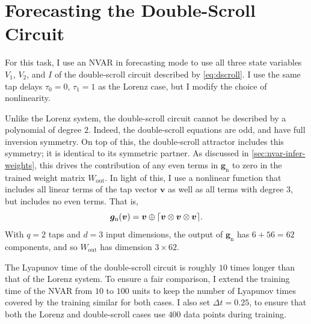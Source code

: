 \section{Forecasting the Double-Scroll Circuit}

For this task, I use an NVAR in forecasting mode to use all
three state variables $V_1$, $V_2$, and $I$ of the double-scroll
circuit described by \cref{eq:dscroll}. I use the same tap
delays $\tau_0 = 0$, $\tau_1 = 1$ as the Lorenz case, but I modify
the choice of nonlinearity.

Unlike the Lorenz system, the double-scroll circuit cannot be
described by a polynomial of degree $2$. Indeed, the double-scroll
equations are odd, and have full inversion symmetry. On top of this,
the double-scroll attractor includes this symmetry; it is identical to
its symmetric partner. As discussed in \cref{sec:nvar-infer-weights},
this drives the contribution of any even terms in $\bm{g}_\text{n}$ to
zero in the trained weight matrix $W_\text{out}$. In light of this, I
use a nonlinear function that includes all linear terms of the tap
vector $\bm{v}$ as well as all terms with degree $3$, but includes no
even terms. That is,
\begin{equation}
  \bm{g}_\text{n}(\bm{v}) = \bm{v} \oplus \lceil\bm{v} \otimes \bm{v} \otimes \bm{v}\rceil.
\end{equation}
With $q = 2$ taps and $d = 3$ input dimensions, the output of
$\bm{g}_\text{n}$ has $6 + 56 = 62$ components, and so $W_\text{out}$
has dimension $3 \times 62$.

The Lyapunov time of the double-scroll circuit is roughly $10$ times
longer than that of the Lorenz system. To ensure a fair comparison, I
extend the training time of the NVAR from $10$ to $100$ units to keep
the number of Lyapunov times covered by the training similar for both
cases. I also set $\Delta t = 0.25$, to ensure that both the Lorenz
and double-scroll cases use $400$ data points during training.

